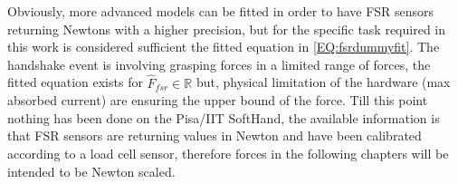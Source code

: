 Obviously, more advanced models can be fitted in order to have FSR sensors returning Newtons with a higher precision, but for the specific task required in this work is considered sufficient the fitted equation in \ref{EQ:fsrdummyfit}. The handshake event is involving grasping forces in a limited range of forces, the fitted equation exists for $ \hat{F}_{fsr} \in \mathbb{R}$ but, physical limitation of the hardware (max absorbed current) are ensuring the upper bound of the force. Till this point nothing has been done on the Pisa/IIT SoftHand, the available information is that FSR sensors are returning values in Newton and have been calibrated according to a load cell sensor, therefore forces in the following chapters will be intended to be Newton scaled. 
